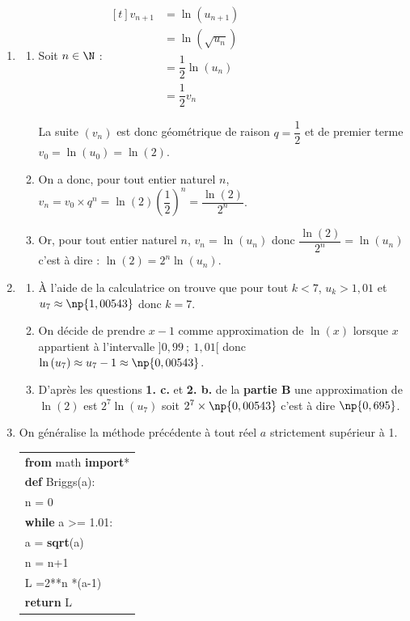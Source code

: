 \begin{enumerate}
\item
	\begin{enumerate}
		\item Soit $n \in \N$ : $\begin{aligned}[t] v_{n+1}& =\ln \left(u_{n+1}\right)\\
	&= \ln \left( \sqrt{u_{n}}\right)\\
	& = \dfrac{1}{2}\ln\left(u_n\right)\\
	&= \dfrac{1}{2}v_n
\end{aligned}$

La suite $\left(v_{n}\right)$ est donc géométrique de raison $q=\dfrac{1}{2}$ et de premier terme \linebreak $v_0=\ln\left(u_0\right)=\ln(2)$.
		\item On a donc, pour tout entier naturel $n$, $v_n=v_0\times q^n=\ln(2)\left(\dfrac{1}{2}\right)^n=\dfrac{\ln(2)}{2^n}$.
		\item  Or, pour tout entier naturel $n$,  $v_n=\ln \left(u_{n}\right)$ donc $\dfrac{\ln\left( 2 \right)}{2^n}= \ln \left(u_{n}\right)$ c'est à dire : $\ln(2)=2^n\ln\left(u_n\right)$.
	\end{enumerate}
\item
	\begin{enumerate}
		\item À l'aide de la calculatrice on trouve que pour tout $k<7$, $u_k > 1,01$ et \linebreak $u_{7}\approx \np{1,00543}$ donc $k=7$.
		\item On décide de prendre $x - 1$ comme approximation de $\ln (x)$ lorsque $x$ appartient à l'intervalle $]0,99~;~1,01[$ donc $\ln\left(u_{7}\right)\approx u_{7} - 1 \approx \np{0,00543}$.
\item D'après les questions \textbf{1. c.} et \textbf{2. b.} de la \textbf{partie B} une approximation de $\ln (2)$ est $2^7\ln\left(u_7\right)$ soit $2^7 \times \np{0,00543}$ c'est à dire $\np{0,695}$.
	\end{enumerate}
\item On généralise la méthode précédente à tout réel $a$ strictement supérieur à 1.

\begin{center}
\begin{ttfamily}
\begin{tabularx}{8cm}{|X|}\hline
\textbf{from} math \textbf{import}*\\
\textbf{def} Briggs(a):\\
\quad n = 0\\
\quad \textbf{while} a >= 1.01:\\
\quad \quad a = \textbf{sqrt}(a)\\
\quad \quad n = n+1\\
\quad L =2**n *(a-1) \\
\textbf{return} L\\ \hline
\end{tabularx}
\end{ttfamily}
\end{center}
\end{enumerate}

\bigskip
